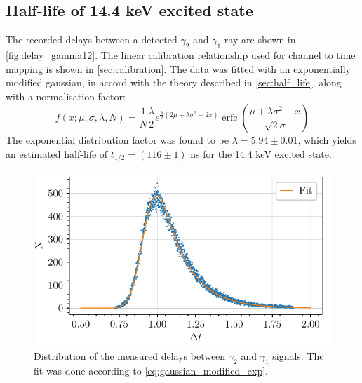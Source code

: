 \subsection{Half-life of 14.4 keV excited state}

The recorded delays between a detected \(\gamma_2\) and \(\gamma_1\) ray are shown in \autoref{fig:delay_gamma12}. The linear calibration relationship used for channel to time mapping is shown in \autoref{sec:calibration}. The data was fitted with an exponentially modified gaussian, in accord with the theory described in \autoref{sec:half_life}, along with a normalisation factor:
\begin{equation}
    f(x;\mu,\sigma,\lambda, N) = \frac{1}{N} \frac{\lambda}{2} e^{\frac{\lambda}{2} (2 \mu + \lambda \sigma^2 - 2 x)}
             \operatorname{erfc} \left(\frac{\mu + \lambda \sigma^2 - x}{ \sqrt{2} \sigma}\right)
    \label{eq:gaussian_modified_exp}
\end{equation}
The exponential distribution factor was found to be \(\lambda = 5.94 \pm 0.01\), which yields an estimated half-life of \(t_{1/2} = (116 \pm 1)\) ns for the 14.4 keV excited state.

\begin{figure}[h]
    \centering
    \includegraphics[scale=1]{figures/co57_halflife.pdf}    
    \caption{Distribution of the measured delays between \(\gamma_2\) and \(\gamma_1\) signals. The fit was done according to \autoref{eq:gaussian_modified_exp}.}
    \label{fig:delay_gamma12}
\end{figure}

